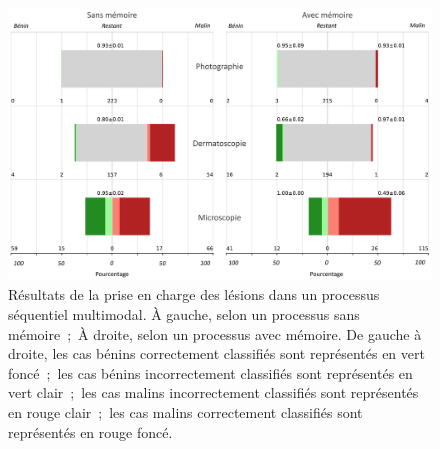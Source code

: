 \begin{figure}[H]
    \centering
    \includegraphics[width=0.9\linewidth]{contents/chapter_8/resources/results_lesions_management.pdf}
    \caption{Résultats de la prise en charge des lésions dans un processus séquentiel multimodal. À gauche, selon un processus sans mémoire~;~À droite, selon un processus avec mémoire. De gauche à droite, les cas bénins correctement classifiés sont représentés en vert foncé~;~les cas bénins incorrectement classifiés sont représentés en vert clair~;~les cas malins incorrectement classifiés sont représentés en rouge clair~;~les cas malins correctement classifiés sont représentés en rouge foncé.}
    \label{fig:results_lesions_management}
\end{figure}\par

